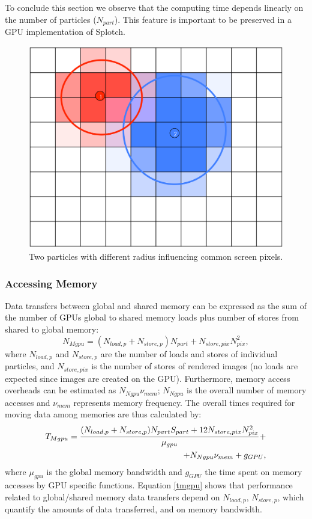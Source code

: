 \documentclass[smallextended]{svjour3}
\begin{document}
To conclude this section we observe that the computing time depends linearly on the number of particles ($N_{part}$). This feature is important to be preserved in a GPU implementation of Splotch.

\begin{figure}
\includegraphics[scale=0.1]{particles.eps}
\caption{Two particles with different radius influencing common screen pixels.}
\label{fig:particles}
\end{figure}

\subsubsection{Accessing Memory}
Data transfers between global and shared memory can be expressed 
as the sum of the number of GPUs global to shared memory loads plus number of stores from shared to global memory:
\begin{equation}
N_{Mgpu} = (N_{load,p} + N_{store,p}) N_{part} + N_{store,pix} N_{pix}^2,
\end{equation}
where $N_{load,p}$ and $N_{store,p}$ are the number of loads and stores of individual 
particles, and $N_{store,pix}$ is the number of stores of rendered images (no loads 
are expected since images are created on the GPU). 
Furthermore, memory access overheads can be estimated as $N_{Ngpu} \nu_{mem}$; $N_{Ngpu}$ is the overall number of memory accesses and $\nu_{mem}$ represents memory frequency. The overall times required for moving data among memories are thus calculated by:
\begin{equation}\label{tmgpu}
\begin{split}
T_{Mgpu} = {(N_{load,p} + N_{store,p}) N_{part} S_{part}
+ 12 N_{store,pix} N_{pix}^2\over \mu_{gpu}} + \\
+ N_{Ngpu} \nu_{mem} + g_{GPU},
\end{split}
\end{equation}
where $\mu_{gpu}$ is the global memory bandwidth
and $g_{GPU}$ the time 
spent on memory accesses by GPU specific functions. Equation \eqref{tmgpu} shows that performance related to global/shared memory data transfers depend on $N_{load,p}$, $N_{store,p}$, which quantify the amounts of data transferred, and on memory bandwidth.
\end{document}
